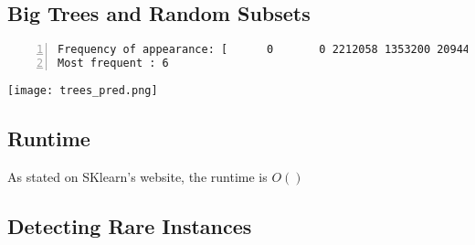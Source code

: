 \subsection{Big Trees and Random Subsets}
\begin{lstlisting}[language={},numbers=left,numberstyle=\tiny,frame=single,breaklines=true,postbreak=\mbox{\textcolor{red}{$\hookrightarrow$}\space}]
Frequency of appearance: [      0       0 2212058 1353200 2094475   22530 2690463  536110   91164]
Most frequent : 6
\end{lstlisting}

\texttt{[image: trees\_pred.png]}


\subsection{Runtime}
As stated on SKlearn's website, the runtime is $O()$
\subsection{Detecting Rare Instances}